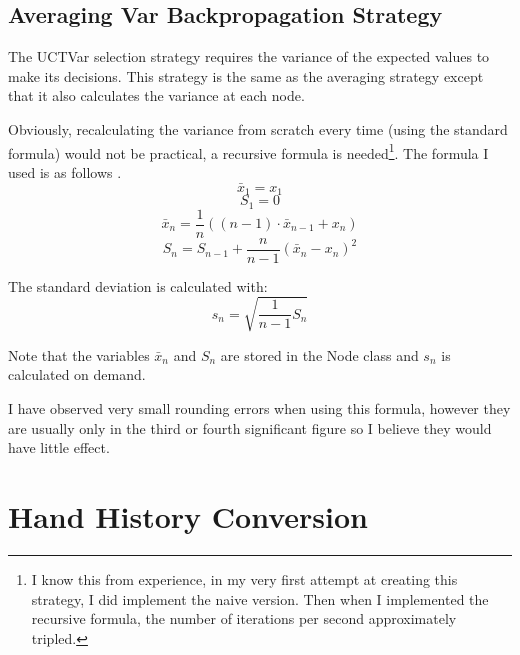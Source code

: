 \subsection{Averaging Var Backpropagation Strategy}	%

The UCTVar selection strategy requires the variance of the expected values to make its decisions. This strategy is the same as the averaging strategy except that it also calculates the variance at each node. 

Obviously, recalculating the variance from scratch every time (using the standard formula) would not be practical, a recursive formula is needed\footnote{I know this from experience, in my very first attempt at creating this strategy, I did implement the naive version. Then when I implemented the recursive formula, the number of iterations per second approximately tripled.}. The formula I used is as follows \cite{recursivevariance}.
\[ \bar{x}_1 = x_1 \]
\[ S_1 = 0 \]
\[ \bar{x}_n = \frac{1}{n}((n-1) \cdot \bar{x}_{n-1} + x_n) \]
\[S_n = S_{n-1} + \frac{n}{n-1} ( \bar{x}_n - x_n )^2 \]

The standard deviation is calculated with: 
\[ s_n = \sqrt{\frac{1}{n-1}S_n} \]

Note that the variables \(\bar{x}_n\) and \(S_n\) are stored in the Node class and \(s_n\) is calculated on demand. 

I have observed very small rounding errors when using this formula, however they are usually only in the third or fourth significant figure so I believe they would have little effect. 


\section{Hand History Conversion}				%



